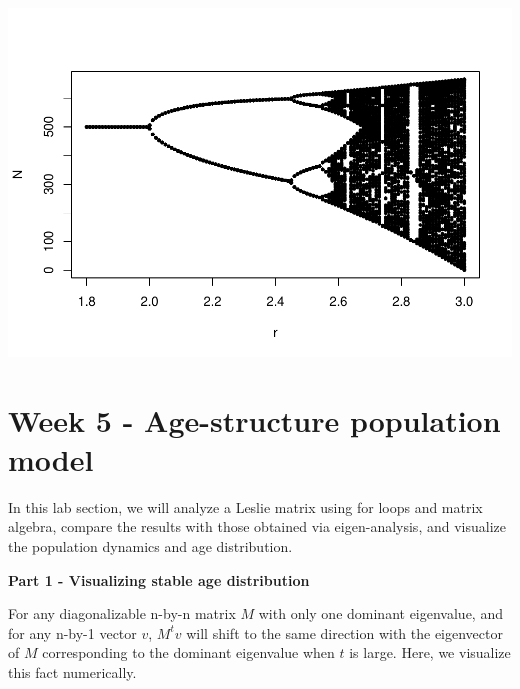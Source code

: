 \documentclass[
]{book}
\newenvironment{Shaded}{\begin{snugshade}}{\end{snugshade}}
\newcommand{\AttributeTok}[1]{\textcolor[rgb]{0.13,0.29,0.53}{#1}}
\newcommand{\CommentTok}[1]{\textcolor[rgb]{0.56,0.35,0.01}{\textit{#1}}}
\newcommand{\DecValTok}[1]{\textcolor[rgb]{0.00,0.00,0.81}{#1}}
\newcommand{\FunctionTok}[1]{\textcolor[rgb]{0.13,0.29,0.53}{\textbf{#1}}}
\newcommand{\NormalTok}[1]{#1}
\newcommand{\OtherTok}[1]{\textcolor[rgb]{0.56,0.35,0.01}{#1}}
\newcommand{\SpecialCharTok}[1]{\textcolor[rgb]{0.81,0.36,0.00}{\textbf{#1}}}
\begin{document}
\includegraphics{bookdown-demo_files/figure-latex/unnamed-chunk-16-1.pdf}

\hypertarget{week-5---age-structure-population-model}{%
\chapter*{Week 5 - Age-structure population model}\label{week-5---age-structure-population-model}}

In this lab section, we will analyze a Leslie matrix using for loops and matrix algebra, compare the results with those obtained via eigen-analysis, and visualize the population dynamics and age distribution.

\textbf{Part 1 - Visualizing stable age distribution}

For any diagonalizable n-by-n matrix \(M\) with only one dominant eigenvalue, and for any n-by-1 vector \(v\), \(M^tv\) will shift to the same direction with the eigenvector of \(M\) corresponding to the dominant eigenvalue when \(t\) is large. Here, we visualize this fact numerically.

\begin{Shaded}
\end{Shaded}
\end{document}
